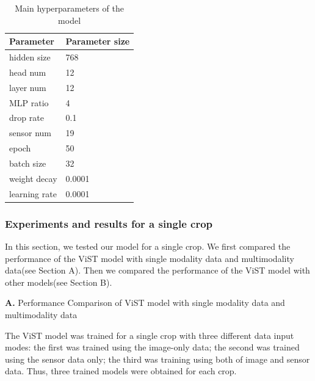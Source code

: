\documentclass[acmsmall,manuscript, screen, review]{acmart}
\begin{document}
\begin{table}[htbp]
  \centering
  \caption{Main hyperparameters of the model}
  \begin{tabular}{ll}
    \toprule
    Parameter    & \multicolumn{1}{l}{Parameter size} \\
    \midrule
    hidden size  & 768                                \\
    head num     & 12                                 \\
    layer num    & 12                                 \\
    MLP ratio    & 4                                  \\
    drop rate    & 0.1                                \\
    sensor num   & 19                                 \\
    epoch        & 50                                 \\
    batch size   & 32                                 \\
    weight decay & 0.0001                             \\
    learning rate & 0.0001                             \\

    \bottomrule
  \end{tabular}%
  \label{tab:hyperparameters}%
\end{table}%

\subsubsection{Experiments and results for a single crop}

In this section, we tested our model for a single crop. We first compared the performance of the ViST model with single modality  data and multimodality data(see Section A). Then we compared the performance of the ViST model with other models(see Section B).

\textbf{A.}	Performance Comparison  of ViST model with single modality data and multimodality data

The ViST model was trained for a single crop with three different data input modes:  the first was trained using the image-only data; the second was trained using the sensor data only; the third was training using both of image and sensor data. Thus, three trained models were obtained for each crop.
\end{document}

